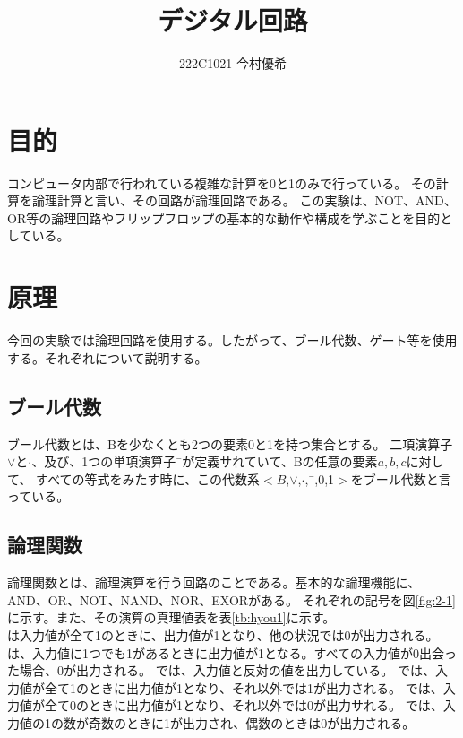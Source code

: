 \documentclass[dvipdfmx]{jsarticle}
\begin{document}
\title{デジタル回路}
\author{222C1021 今村優希}
\maketitle
\newpage

\section{目的}

コンピュータ内部で行われている複雑な計算を0と1のみで行っている。
その計算を論理計算と言い、その回路が論理回路である。
この実験は、NOT、AND、OR等の論理回路やフリップフロップの基本的な動作や構成を学ぶことを目的としている。

\section{原理}

今回の実験では論理回路を使用する。したがって、ブール代数、ゲート等を使用する。それぞれについて説明する。

\subsection{ブール代数}

ブール代数とは、Bを少なくとも2つの要素0と1を持つ集合とする。
二項演算子$\vee$と$\cdot$、及び、1つの単項演算子¯が定義サれていて、Bの任意の要素$a,b,c$に対して、
すべての等式をみたす時に、この代数系$<$$B$,$\vee$,$\cdot$,¯,0,1$>$をブール代数と言っている。

\subsection{論理関数}
論理関数とは、論理演算を行う回路のことである。基本的な論理機能に、AND、OR、NOT、NAND、NOR、EXORがある。
それぞれの記号を図\ref{fig:2-1}に示す。また、その演算の真理値表を表\ref*{tb:hyou1}に示す。\\

は入力値が全て1のときに、出力値が1となり、他の状況では0が出力される。
は、入力値に1つでも1があるときに出力値が1となる。すべての入力値が0出会った場合、0が出力される。
では、入力値と反対の値を出力している。
では、入力値が全て1のときに出力値が1となり、それ以外では1が出力される。
では、入力値が全て0のときに出力値が1となり、それ以外では0が出力サれる。
では、入力値の1の数が奇数のときに1が出力され、偶数のときは0が出力される。
\end{document}
